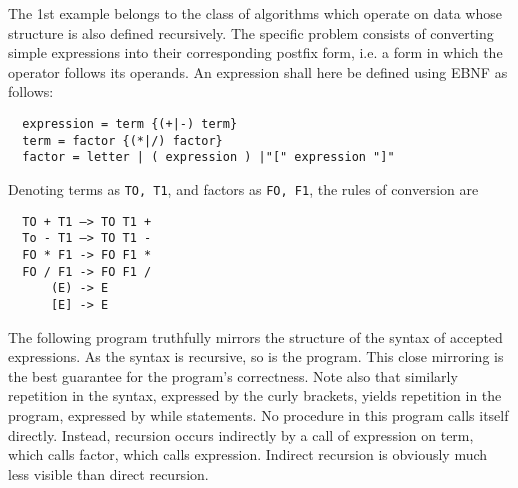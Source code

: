 The 1st example belongs to the class of algorithms which operate on data whose structure
is also defined recursively. The specific problem consists of converting simple expressions
into their corresponding postfix form, i.e. a form in which the operator follows its operands.
An expression shall here be defined using EBNF as follows:
\begin{verbatim}
  expression = term {(+|-) term}
  term = factor {(*|/) factor}
  factor = letter | ( expression ) |"[" expression "]"
\end{verbatim}
Denoting terms as \verb|TO, T1|, and factors as \verb|FO, F1|, the rules of conversion are
\begin{verbatim}
  TO + T1 —> TO T1 +
  To - T1 —> TO T1 -
  FO * F1 -> FO F1 *
  FO / F1 -> FO F1 /
      (E) -> E
      [E] -> E
\end{verbatim}
The following program truthfully mirrors the structure of the syntax of accepted expressions.
As the syntax is recursive, so is the program. This close mirroring is the best guarantee
for the program's correctness. Note also that similarly repetition in the syntax, expressed
by the curly brackets, yields repetition in the program, expressed by while statements.
No procedure in this program calls itself directly. Instead, recursion occurs indirectly
by a call of expression on term, which calls factor, which calls expression. Indirect
recursion is obviously much less visible than direct recursion.

